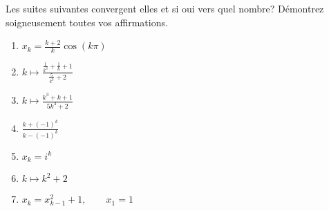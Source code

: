 
\begin{exercice}\label{exo0012}

Les suites suivantes convergent elles et si oui vers quel nombre?  Démontrez soigneusement toutes vos affirmations.
\begin{multicols}{2}
\begin{enumerate}
	\item  $x_k = \frac{k+2}{k} \cos(k \pi)$
	\item  $k \mapsto \frac{ \frac{1}{k^3} + \frac{1}{k} +1 }{\frac{5}{k^3} +2}$
	\item  $k \mapsto \frac{k^3 +k +1}{5k^3 + 2} $
	\item  $\frac{k + (-1)^k}{k- (-1)^k}$
	\item  $x_k = i^k$
	\item  $k \mapsto k^2 +2$
	\item  $x_k = x_{k-1}^2 + 1, \qquad x_1 = 1$
\end{enumerate}
\end{multicols}
\end{exercice}
